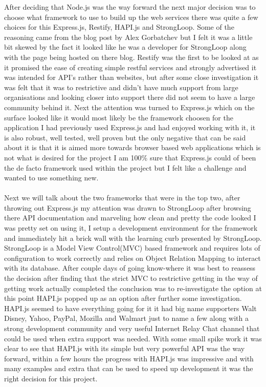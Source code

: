After deciding that Node.js was the way forward the next major decision was to choose what framework to use to build up the web services there was quite a few choices for this Express.js, Restify, HAPI.js and StrongLoop. Some of the reasoning came from the blog post by Alex Gorbatchev \cite{AlexGorbatchev:CompairingExpressRestifyHapLoopBack:2015:online} but I felt it was a little bit skewed by the fact it looked like he was a developer for StrongLoop along with the page being hosted on there blog. Restify was the first to be looked at as it promised the ease of creating simple restful services and strongly advertised it was intended for API's rather than websites, but after some close investigation it was felt that it was to restrictive and didn't have much support from large organisations and looking closer into support there did not seem to have a large community behind it. Next the attention was turned to Express.js which on the surface looked like it would most likely be the framework choosen for the application I had previously used Express.js and had enjoyed working with it, it is also robust, well tested, well proven but the only negative that can be said about it is that it is aimed more towards browser based web applications which is not what is desired for the project I am 100\% sure that Express.js could of been the de facto framework used within the project but I felt like a challenge and wanted to use something new.\\
\\
Next we will talk about the two frameworks that were in the top two, after throwing out Express.js my attention was drawn to StrongLoop after browsing there API documentation and marveling how clean and pretty the code looked I was pretty set on using it, I setup a development environment for the framework and immediately hit a brick wall with the learning curb presented by StrongLoop. StrongLoop is a Model View Control(MVC) based framework and requires lots of configuration to work correctly and relies on Object Relation Mapping to interact with its database. After couple days of going know-where it was best to reassess the decision after finding that the strict MVC to restrictive getting in the way of getting work actually completed the conclusion was to re-investigate the option at this point HAPI.js popped up as an option after further some investigation. HAPI.js seemed to have everything going for it it had big name supporters Walt Disney, Yahoo, PayPal, Mozilla and Walmart just to name a few along with a strong development community and very useful Internet Relay Chat channel that could be used when extra support was needed. With some small spike work it was clear to see that HAPI.js with its simple but very powerful API was the way forward, within a few hours the progress with HAPI.js was impressive and with many examples and extra that can be used to speed up development it was the right decision for this project.

